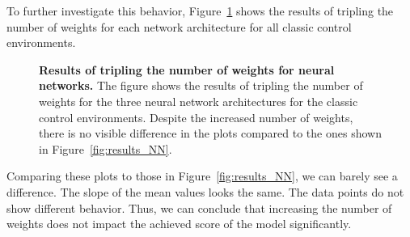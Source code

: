 To further investigate this behavior, Figure~\ref{fig:results_NN_weights} shows the results of tripling the number of weights for each network architecture for all classic control environments.
\begin{figure}[!ht]
\begin{figrow}
\item \label{row:NN_CartPole_wfactor_3}  
\item \label{row:NN_Acrobot_wfactor_3}  
\item \label{row:NN_MountainCar_wfactor_3}  
\item \label{row:NN_Pendulum_wfactor_3}  
\end{figrow}
\vspace*{-5mm}
\caption[Results of tripling the number of weights for neural networks]{
  \textbf{Results of tripling the number of weights for neural networks.}
   The figure shows the results of tripling the number of weights for the three neural network architectures for the classic control environments. Despite the increased number of weights, there is no visible difference in the plots compared to the ones shown in Figure~\ref{fig:results_NN}.
}
\label{fig:results_NN_weights}
\end{figure}
Comparing these plots to those in Figure~\ref{fig:results_NN}, we can barely see a difference. The slope of the mean values looks the same. The data points do not show different behavior. Thus, we can conclude that increasing the number of weights does not impact the achieved score of the model significantly.

